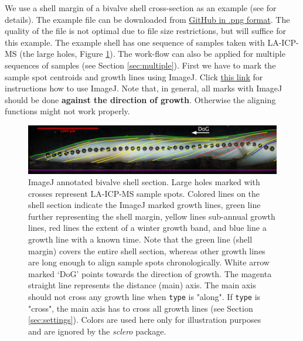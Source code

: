 \documentclass[11pt, a4paper]{article}
\newcommand{\sclero}{\textit{sclero}\xspace}
\begin{document}
We use a shell margin of a bivalve shell cross-section as an example (see \citealp{d18O_paper} for details). The example file can be downloaded from \href{https://github.com/MikkoVihtakari/sclero/blob/master/inst/extdata/shellspots.png}{GitHub in .png format}. The quality of the file is not optimal due to file size restrictions, but will suffice for this example. The example shell has one sequence of samples taken with LA-ICP-MS (the large holes, Figure \ref{Fig:marked}). The work-flow can also be applied for multiple sequences of samples (see Section \ref{sec:multiple}). First we have to mark the sample spot centroids and growth lines using ImageJ. Click \href{http://imagej.nih.gov/ij/docs/guide/user-guide.pdf}{this link} for instructions how to use ImageJ. Note that, in general, all marks with ImageJ should be done \textbf{against the direction of growth}. Otherwise the aligning functions might not work properly.

\begin{figure}[H]
\includegraphics[width=1\textwidth]{marked_shell.pdf}
\caption{ImageJ annotated bivalve shell section. Large holes marked with crosses represent LA-ICP-MS sample spots. Colored lines on the shell section indicate the ImageJ marked growth lines, green line further representing the shell margin, yellow lines sub-annual growth lines, red lines the extent of a winter growth band, and blue line a growth line with a known time. Note that the green line (shell margin) covers the entire shell section, whereas other growth lines are long enough to align sample spots chronologically. White arrow marked `DoG' points towards the direction of growth. The magenta straight line represents the distance (main) axis. The main axis should not cross any growth line when \texttt{type} is "along". If \texttt{type} is "cross", the main axis has to cross all growth lines (see Section \ref{sec:settings}). Colors are used here only for illustration purposes and are ignored by the \sclero package.}
\label{Fig:marked}
\end{figure}
\end{document}
